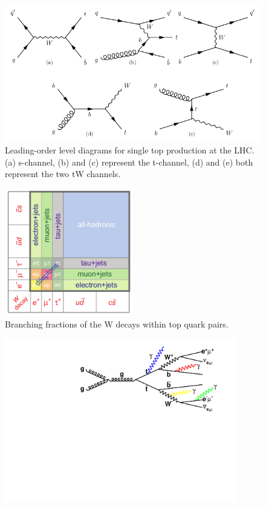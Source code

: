 \begin{figure} \label{fig-singletopProductionLHC}
\begin{center}
\includegraphics[width=\textwidth]{Figures/singletopProductionLHC.png}
\caption{Leading-order level diagrams for single top production at the LHC. {(a)} s-channel, {(b)} and {(c)} represent the t-channel, {(d)} and {(e)} both represent the two tW channels. \cite{SergeyThesis}}
\end{center}
\end{figure}

\begin{figure}
\begin{center}
\includegraphics[width=0.5\textwidth]{Figures/ttbarDecayFractions.png}
\caption{Branching fractions of the W decays within top quark pairs. \cite{ttbarDecayFractions}}
\end{center}
\end{figure}

\begin{figure} \label{fig-ttgammaFeynmanDiagram}
\begin{center}
\includegraphics[width=0.9\textwidth]{Figures/ttgammaFeynmanDiagram.pdf}
\caption{}
\end{center}
\end{figure}